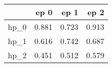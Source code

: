 \begin{tabular}{lrrr}
\toprule
{} &   ep 0 &   ep 1 &   ep 2 \\
\midrule
hp\_0 &  0.881 &  0.723 &  0.913 \\
hp\_1 &  0.616 &  0.742 &  0.687 \\
hp\_2 &  0.451 &  0.512 &  0.579 \\
\bottomrule
\end{tabular}
